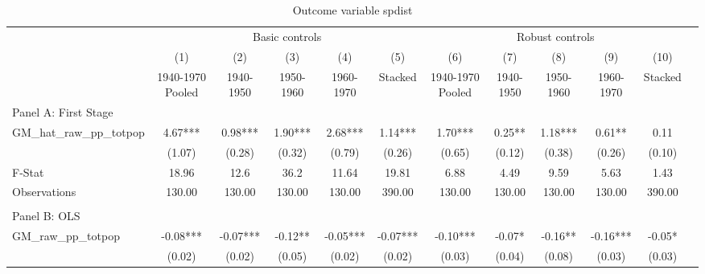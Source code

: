  \begin{table}[htbp]\centering {} \begin{threeparttable} \caption{Outcome variable spdist} \begin{tabular}{l*{11}{c}} \toprule
          &\multicolumn{5}{c}{Basic controls}                                   &\multicolumn{5}{c}{Robust controls}                                  \\\cmidrule(lr){2-6}\cmidrule(lr){7-11}
          &\multicolumn{1}{c}{(1)}&\multicolumn{1}{c}{(2)}&\multicolumn{1}{c}{(3)}&\multicolumn{1}{c}{(4)}&\multicolumn{1}{c}{(5)}&\multicolumn{1}{c}{(6)}&\multicolumn{1}{c}{(7)}&\multicolumn{1}{c}{(8)}&\multicolumn{1}{c}{(9)}&\multicolumn{1}{c}{(10)}\\
          &\multicolumn{1}{c}{1940-1970 Pooled}&\multicolumn{1}{c}{1940-1950}&\multicolumn{1}{c}{1950-1960}&\multicolumn{1}{c}{1960-1970}&\multicolumn{1}{c}{Stacked}&\multicolumn{1}{c}{1940-1970 Pooled}&\multicolumn{1}{c}{1940-1950}&\multicolumn{1}{c}{1950-1960}&\multicolumn{1}{c}{1960-1970}&\multicolumn{1}{c}{Stacked}\\
\cmidrule(lr){1-11}
\multicolumn{10}{l}{Panel A: First Stage}\\
\cmidrule(lr){1-11}
GM\_hat\_raw\_pp\_totpop&      4.67***&      0.98***&      1.90***&      2.68***&      1.14***&      1.70***&      0.25** &      1.18***&      0.61** &      0.11   \\
          &    (1.07)   &    (0.28)   &    (0.32)   &    (0.79)   &    (0.26)   &    (0.65)   &    (0.12)   &    (0.38)   &    (0.26)   &    (0.10)   \\
\midrule
F-Stat    &     18.96   &      12.6   &      36.2   &     11.64   &     19.81   &      6.88   &      4.49   &      9.59   &      5.63   &      1.43   \\
Observations&    130.00   &    130.00   &    130.00   &    130.00   &    390.00   &    130.00   &    130.00   &    130.00   &    130.00   &    390.00   \\
\cmidrule[\heavyrulewidth](lr){1-11} \\ \cmidrule[\heavyrulewidth](lr){1-11}
\multicolumn{10}{l}{Panel B: OLS}\\
\cmidrule(lr){1-11}
GM\_raw\_pp\_totpop&     -0.08***&     -0.07***&     -0.12** &     -0.05***&     -0.07***&     -0.10***&     -0.07*  &     -0.16** &     -0.16***&     -0.05*  \\
          &    (0.02)   &    (0.02)   &    (0.05)   &    (0.02)   &    (0.02)   &    (0.03)   &    (0.04)   &    (0.08)   &    (0.03)   &    (0.03)   \\

\end{tabular}
\end{threeparttable}
\end{table}
